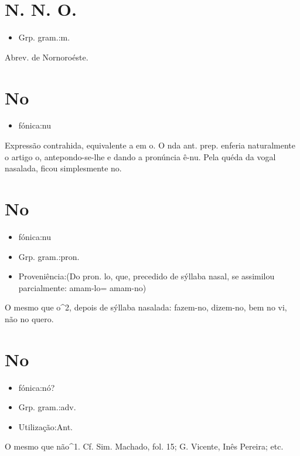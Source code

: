 \section{N. N. O.}
\begin{itemize}
\item {Grp. gram.:m.}
\end{itemize}
Abrev. de \textunderscore Nornoroéste\textunderscore .
\section{No}
\begin{itemize}
\item {fónica:nu}
\end{itemize}
Expressão contrahida, equivalente a \textunderscore em o\textunderscore .
O \textunderscore n\textunderscore  da ant. prep. \textunderscore en\textunderscore  feria naturalmente o artigo \textunderscore o\textunderscore , antepondo-se-lhe e dando a pronúncia \textunderscore ê-nu\textunderscore . Pela quéda da vogal nasalada, ficou simplesmente \textunderscore no\textunderscore .
\section{No}
\begin{itemize}
\item {fónica:nu}
\end{itemize}
\begin{itemize}
\item {Grp. gram.:pron.}
\end{itemize}
\begin{itemize}
\item {Proveniência:(Do pron. \textunderscore lo\textunderscore , que, precedido de sýllaba nasal, se assimilou parcialmente: \textunderscore amam-lo\textunderscore  = \textunderscore amam-no\textunderscore )}
\end{itemize}
O mesmo que \textunderscore o\textunderscore ^2, depois de sýllaba nasalada: \textunderscore fazem-no\textunderscore , \textunderscore dizem-no\textunderscore , \textunderscore bem no vi\textunderscore , \textunderscore não no quero\textunderscore .
\section{No}
\begin{itemize}
\item {fónica:nó?}
\end{itemize}
\begin{itemize}
\item {Grp. gram.:adv.}
\end{itemize}
\begin{itemize}
\item {Utilização:Ant.}
\end{itemize}
O mesmo que \textunderscore não\textunderscore ^1. Cf. Sim. Machado, fol. 15; G. Vicente, \textunderscore Inês Pereira\textunderscore ; etc.
